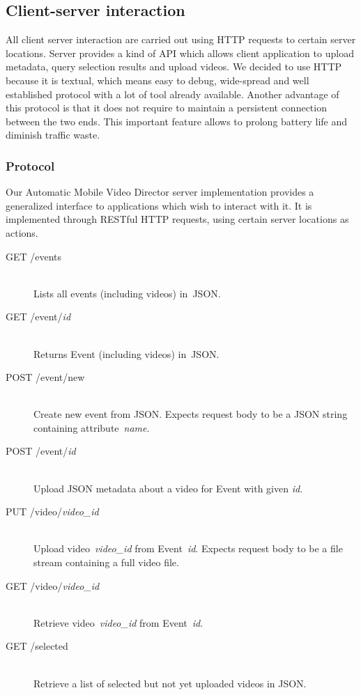 \documentclass[conference]{IEEEtran}
\begin{document}
\subsection{Client-server interaction}

All client server interaction are carried out using HTTP requests to certain server locations.
Server provides a kind of API which allows client application to upload metadata, query selection results and upload videos.
We decided to use HTTP because it is textual, which means easy to debug, 
wide-spread and well established protocol with a lot of tool already available. 
Another advantage of this protocol is that it does not require to maintain a persistent connection between the two ends.
This important feature allows to prolong battery life and diminish traffic waste.


\subsubsection{Protocol}

Our Automatic Mobile Video Director server implementation provides 
a generalized interface to applications which wish to interact with it. 
It is implemented through RESTful HTTP requests, using certain server locations as actions.

\begin{description}
	\item[GET /events]\hfill\\
		Lists all events (including videos) in~JSON.
		
	\item[GET /event/\textit{id}]\hfill\\
		Returns Event (including videos) in~JSON.
				
	\item[POST /event/new]\hfill\\
		Create new event from JSON.
		Expects request body to be a JSON string containing attribute~\textit{name}.
		
	\item[POST /event/\textit{id}]\hfill\\
		Upload JSON metadata about a video for Event with given \textit{id}.
		
	\item[PUT /video/\textit{video\_id}]\hfill\\
		Upload video~\textit{video\_id} from Event~\textit{id}.
		Expects request body to be a file stream containing a full video file.
		
	\item[GET /video/\textit{video\_id}]\hfill\\
		Retrieve video~\textit{video\_id} from Event~\textit{id}.
		
	\item[GET /selected]\hfill\\
		Retrieve a list of selected but not yet uploaded videos in JSON.	
		
\end{description}
\end{document}
